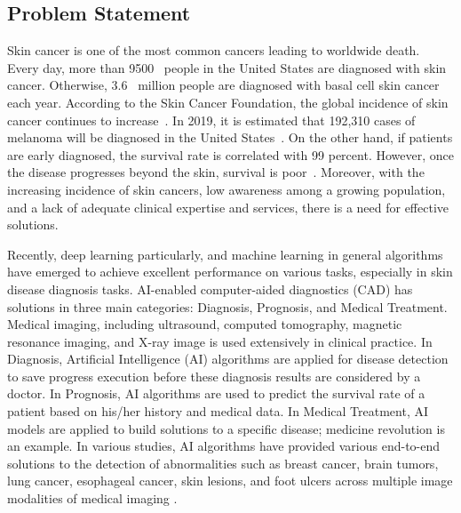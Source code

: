 \documentclass[sensors,article,accept,pdftex,moreauthors]{Definitions/mdpi}
\begin{document}
	\subsection{Problem Statement}
	{Skin cancer is one of the most common cancers leading to worldwide death. {Every day, more than 9500~\mbox{\cite{03358}} }%
	people in the United States are diagnosed with skin cancer. Otherwise, 3.6~\mbox{\cite{03358}} million people are diagnosed with basal cell skin cancer each year. According to the Skin Cancer Foundation, the global incidence of skin cancer continues to increase~\mbox{\cite{11872}}. In 2019, it is estimated that 192,310 cases of melanoma will be diagnosed in the United States~\mbox{\cite{11872}}. On the other hand, if patients are early diagnosed, the survival rate is correlated with 99 percent. However, once the disease progresses beyond the skin, survival is poor~\mbox{\cite{11872}}. Moreover, with the increasing incidence of skin cancers, low awareness among a growing population, and a lack of adequate clinical expertise and services, there is a need for effective solutions.}
	
	Recently, deep learning particularly, and machine learning in general algorithms have emerged to achieve excellent performance on various tasks, especially in skin disease diagnosis tasks. AI-enabled computer-aided diagnostics (CAD)\cite{11797} has solutions in three main categories: Diagnosis, Prognosis, and Medical Treatment. Medical imaging, including ultrasound, computed tomography, magnetic resonance imaging, and X-ray image is used extensively in clinical practice. In Diagnosis, Artificial Intelligence (AI) algorithms are applied for disease detection to save progress execution before these diagnosis results are considered by a doctor. In Prognosis, AI algorithms are used to predict the survival rate of a patient based on his/her history and medical data. In Medical Treatment, AI models are applied to build solutions to a specific disease; medicine revolution is an example. In various studies, AI algorithms have provided various end-to-end solutions to the detection of abnormalities such as breast cancer, brain tumors, lung cancer, esophageal cancer, skin lesions, and foot ulcers across multiple image modalities of medical imaging \cite{11872}.
	
\end{document}

